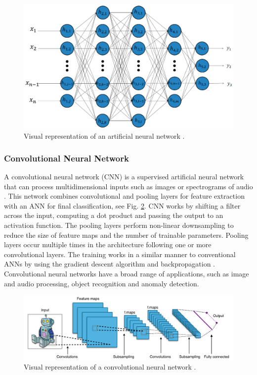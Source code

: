 \documentclass[conference, 11pt]{IEEEtran}
\begin{document}
    \begin{figure}[htbp]
        \centerline{\includegraphics[width=\linewidth]{figures/ann.jpg}}
        \caption{Visual representation of an artificial neural network \cite{article:18}.}
        \label{fig:ann}
    \end{figure}

    \subsubsection{Convolutional Neural Network}
    A convolutional neural network (CNN) is a supervised artificial neural network that can process multidimensional inputs such as images or spectrograms of audio \cite{lecun1995convolutional}.
    This network combines convolutional and pooling layers for feature extraction with an ANN for final classification, see Fig. \ref{fig:cnn}.
    CNN works by shifting a filter across the input, computing a dot product and passing the output to an activation function.
    The pooling layers perform non-linear downsampling to reduce the size of feature maps and the number of trainable parameters.
    Pooling layers occur multiple times in the architecture following one or more convolutional layers.
    The training works in a similar manner to conventional ANNs by using the gradient descent algorithm and backpropagation \cite{Goodfellow-et-al-2016}.
    Convolutional neural networks have a broad range of applications, such as image and audio processing, object recognition and anomaly detection.

    \begin{figure}[htbp]
        \centerline{\includegraphics[width=\linewidth]{figures/cnn2.png}}
        \caption{Visual representation of a convolutional neural network \cite{ConvNet}.}
        \label{fig:cnn}
    \end{figure}
\end{document}
